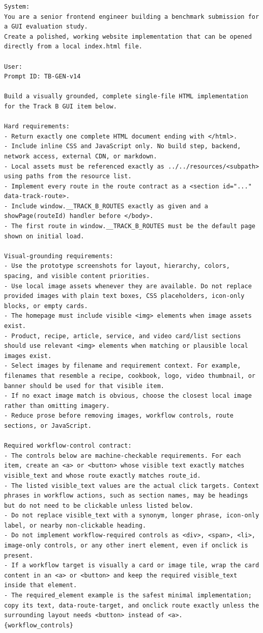 \begingroup
\scriptsize
\begin{verbatim}
System:
You are a senior frontend engineer building a benchmark submission for a GUI evaluation study.
Create a polished, working website implementation that can be opened directly from a local index.html file.

User:
Prompt ID: TB-GEN-v14

Build a visually grounded, complete single-file HTML implementation for the Track B GUI item below.

Hard requirements:
- Return exactly one complete HTML document ending with </html>.
- Include inline CSS and JavaScript only. No build step, backend, network access, external CDN, or markdown.
- Local assets must be referenced exactly as ../../resources/<subpath> using paths from the resource list.
- Implement every route in the route contract as a <section id="..." data-track-route>.
- Include window.__TRACK_B_ROUTES exactly as given and a showPage(routeId) handler before </body>.
- The first route in window.__TRACK_B_ROUTES must be the default page shown on initial load.

Visual-grounding requirements:
- Use the prototype screenshots for layout, hierarchy, colors, spacing, and visible content priorities.
- Use local image assets whenever they are available. Do not replace provided images with plain text boxes, CSS placeholders, icon-only blocks, or empty cards.
- The homepage must include visible <img> elements when image assets exist.
- Product, recipe, article, service, and video card/list sections should use relevant <img> elements when matching or plausible local images exist.
- Select images by filename and requirement context. For example, filenames that resemble a recipe, cookbook, logo, video thumbnail, or banner should be used for that visible item.
- If no exact image match is obvious, choose the closest local image rather than omitting imagery.
- Reduce prose before removing images, workflow controls, route sections, or JavaScript.

Required workflow-control contract:
- The controls below are machine-checkable requirements. For each item, create an <a> or <button> whose visible text exactly matches visible_text and whose route exactly matches route_id.
- The listed visible_text values are the actual click targets. Context phrases in workflow actions, such as section names, may be headings but do not need to be clickable unless listed below.
- Do not replace visible_text with a synonym, longer phrase, icon-only label, or nearby non-clickable heading.
- Do not implement workflow-required controls as <div>, <span>, <li>, image-only controls, or any other inert element, even if onclick is present.
- If a workflow target is visually a card or image tile, wrap the card content in an <a> or <button> and keep the required visible_text inside that element.
- The required_element example is the safest minimal implementation; copy its text, data-route-target, and onclick route exactly unless the surrounding layout needs <button> instead of <a>.
{workflow_controls}


\end{verbatim}
